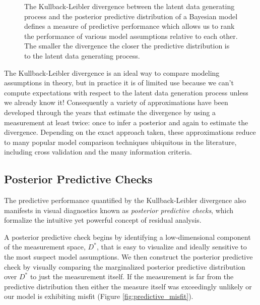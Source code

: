 \begin{figure*}
\centering
%
\caption{The Kullback-Leibler divergence between the
latent data generating process and the posterior predictive distribution
of a Bayesian model defines a measure of predictive performance 
which allows us to rank the performance of various model assumptions 
relative to each other.  The smaller the divergence the closer the predictive
distribution is to the latent data generating process.
}
\label{fig:predictive_performance}
\end{figure*}

The Kullback-Leibler divergence is an ideal way to compare 
modeling assumptions in theory, but in practice it is of limited
use because we can't compute expectations with respect to
the latent data generation process unless we already know it!
Consequently a variety of approximations have been developed 
through the years that estimate the divergence by using a 
measurement at least twice: once to infer a posterior and again 
to estimate the divergence.  Depending on the exact approach 
taken, these approximations reduce to many popular model 
comparison techniques ubiquitous in the literature, including 
cross validation and the many information criteria.

\subsection{Posterior Predictive Checks}

The predictive performance quantified by the Kullback-Leibler
divergence also manifests in visual diagnostics known as
\emph{posterior predictive checks}, which formalize the intuitive 
yet powerful concept of residual analysis. 

A posterior predictive check begins by identifying a low-dimensional
component of the measurement space, $D^{*}$, that is easy to 
visualize and ideally sensitive to the most suspect model 
assumptions.  We then construct the posterior predictive check by 
visually comparing the marginalized posterior predictive distribution 
over $D^{*}$ to just the measurement itself.  If the measurement is 
far from the predictive distribution then either the measure itself was 
exceedingly unlikely or our model is exhibiting misfit (Figure
\ref{fig:predictive_misfit}).

